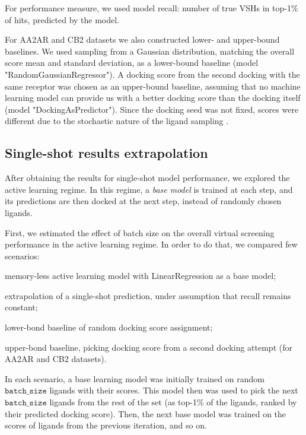For performance measure, we used model recall: number of true VSHs in top-1\% of hits, predicted by the model.

For AA2AR and CB2 datasets we also constructed lower- and upper-bound baselines. We used sampling from a Gaussian distribution, matching the overall score mean and standard deviation, as a lower-bound baseline (model "RandomGaussianRegressor"). A docking score from the second docking with the same receptor was chosen as an upper-bound baseline, assuming that no machine learning model can provide us with a better docking score than the docking itself (model "DockingAsPredictor"). Since the docking seed was not fixed, scores were different due to the stochastic nature of the ligand sampling \cite{abagyan_biased_1994}.

\subsection{Single-shot results extrapolation}

After obtaining the results for single-shot model performance, we explored the active learning regime. In this regime, a \textit{base model} is trained at each step, and its predictions are then docked at the next step, instead of randomly chosen ligands. 

First, we estimated the effect of batch size on the overall virtual screening performance in the active learning regime. In order to do that, we compared few scenarios: 
\begin{enumerate*}[label=(\roman*)]
    \item memory-less active learning model with LinearRegression as a base model;
    \item extrapolation of a single-shot prediction, under assumption that recall remains constant;
    \item lower-bond baseline of random docking score assignment;
    \item upper-bond baseline, picking docking score from a second docking attempt (for AA2AR and CB2 datasets).
\end{enumerate*}

In each scenario, a base learning model was initially trained on random $\texttt{batch\_size}$ ligands with their scores. This model then was used to pick the next $\texttt{batch\_size}$ ligands from the rest of the set (as top-1\% of the ligands, ranked by their predicted docking score). Then, the next base model was trained on the scores of ligands from the previous iteration, and so on.

